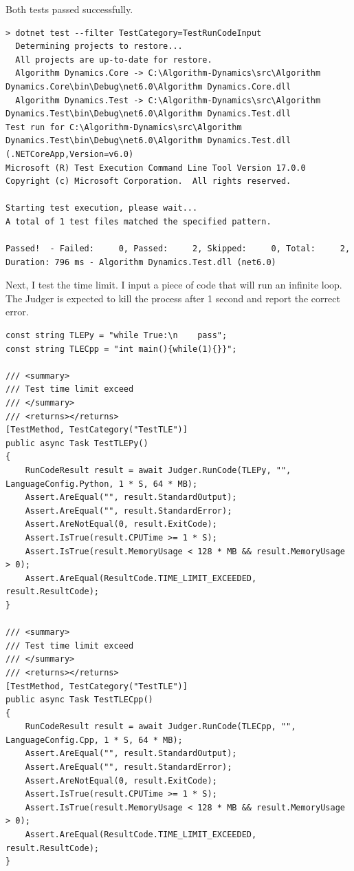 \documentclass[a4paper]{report}
\begin{document}
Both tests passed successfully.

\begin{verbatim}
> dotnet test --filter TestCategory=TestRunCodeInput
  Determining projects to restore...
  All projects are up-to-date for restore.
  Algorithm Dynamics.Core -> C:\Algorithm-Dynamics\src\Algorithm Dynamics.Core\bin\Debug\net6.0\Algorithm Dynamics.Core.dll
  Algorithm Dynamics.Test -> C:\Algorithm-Dynamics\src\Algorithm Dynamics.Test\bin\Debug\net6.0\Algorithm Dynamics.Test.dll
Test run for C:\Algorithm-Dynamics\src\Algorithm Dynamics.Test\bin\Debug\net6.0\Algorithm Dynamics.Test.dll (.NETCoreApp,Version=v6.0)
Microsoft (R) Test Execution Command Line Tool Version 17.0.0
Copyright (c) Microsoft Corporation.  All rights reserved.

Starting test execution, please wait...
A total of 1 test files matched the specified pattern.

Passed!  - Failed:     0, Passed:     2, Skipped:     0, Total:     2, Duration: 796 ms - Algorithm Dynamics.Test.dll (net6.0)
\end{verbatim}

Next, I test the time limit. I input a piece of code that will run an infinite loop. The Judger is expected to kill the process after 1 second and report the correct error.

\begin{verbatim}
const string TLEPy = "while True:\n    pass";
const string TLECpp = "int main(){while(1){}}";

/// <summary>
/// Test time limit exceed
/// </summary>
/// <returns></returns>
[TestMethod, TestCategory("TestTLE")]
public async Task TestTLEPy()
{
    RunCodeResult result = await Judger.RunCode(TLEPy, "", LanguageConfig.Python, 1 * S, 64 * MB);
    Assert.AreEqual("", result.StandardOutput);
    Assert.AreEqual("", result.StandardError);
    Assert.AreNotEqual(0, result.ExitCode);
    Assert.IsTrue(result.CPUTime >= 1 * S);
    Assert.IsTrue(result.MemoryUsage < 128 * MB && result.MemoryUsage > 0);
    Assert.AreEqual(ResultCode.TIME_LIMIT_EXCEEDED, result.ResultCode);
}

/// <summary>
/// Test time limit exceed
/// </summary>
/// <returns></returns>
[TestMethod, TestCategory("TestTLE")]
public async Task TestTLECpp()
{
    RunCodeResult result = await Judger.RunCode(TLECpp, "", LanguageConfig.Cpp, 1 * S, 64 * MB);
    Assert.AreEqual("", result.StandardOutput);
    Assert.AreEqual("", result.StandardError);
    Assert.AreNotEqual(0, result.ExitCode);
    Assert.IsTrue(result.CPUTime >= 1 * S);
    Assert.IsTrue(result.MemoryUsage < 128 * MB && result.MemoryUsage > 0);
    Assert.AreEqual(ResultCode.TIME_LIMIT_EXCEEDED, result.ResultCode);
}
\end{verbatim}
\end{document}
